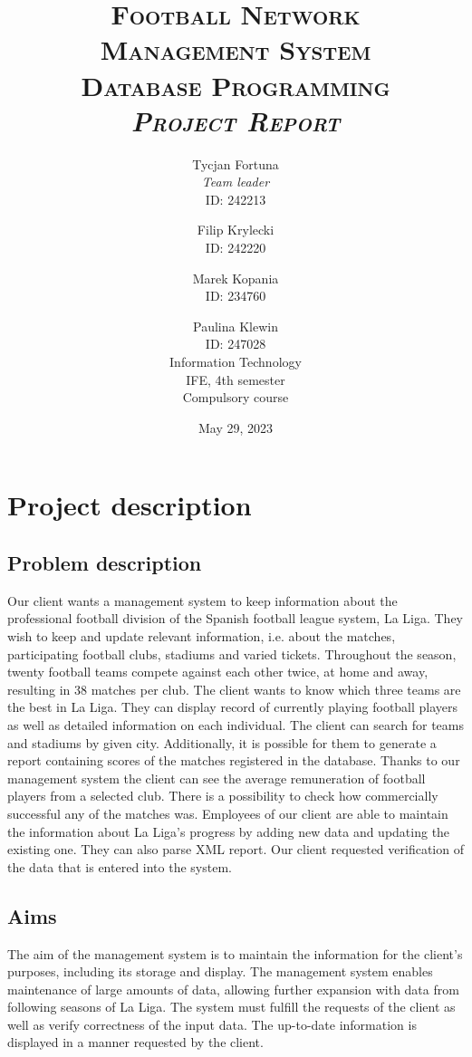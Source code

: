 \documentclass[11pt]{article}
\title{
    \scshape\Huge\textbf{Football Network}
    \\\Huge\textbf{Management System} 
    \\\Large Database Programming
    \\\large\textit {Project Report} 
    \\\vspace{2em}
}
\author{
    Tycjan Fortuna \\\textit{Team leader}\\ID: 242213
        \and
    Filip Krylecki\\ID: 242220
        \and
    Marek Kopania\\ID: 234760
        \and
    Paulina Klewin\\ID: 247028
        \vspace{3em}
    \\Information Technology\\IFE, 4th semester\\Compulsory course
        \vspace{2em}
}
\date{May 29, 2023}
\begin{document}
\maketitle \thispagestyle{empty} \clearpage

\small \tableofcontents
\clearpage

\small \lstlistoflistings
\clearpage

\section{Project description}
\subsection{Problem description}
Our client wants a management system to keep information about the professional football division of the Spanish football league system, La Liga. They wish to keep and update relevant information, i.e. about the matches, participating football clubs, stadiums and varied tickets. Throughout the season, twenty football teams compete against each other twice, at home and away, resulting in 38 matches per club. The client wants to know which three teams are the best in La Liga. They can display record of currently playing football players as well as detailed information on each individual. The client can search for teams and stadiums by given city. Additionally, it is possible for them to generate a report containing scores of the matches registered in the database. Thanks to our management system the client can see the average remuneration of football players from a selected club. There is a possibility to check how commercially successful any of the matches was. Employees of our client are able to maintain the information about La Liga's progress by adding new data and updating the existing one. They can also parse XML report. Our client requested verification of the data that is entered into the system.

\subsection{Aims}
The aim of the management system is to maintain the information for the client's purposes, including its storage and display. The management system enables maintenance of large amounts of data, allowing further expansion with data from following seasons of La Liga. The system must fulfill the requests of the client as well as verify correctness of the input data. The up-to-date information is displayed in a manner requested by the client.
\end{document}
